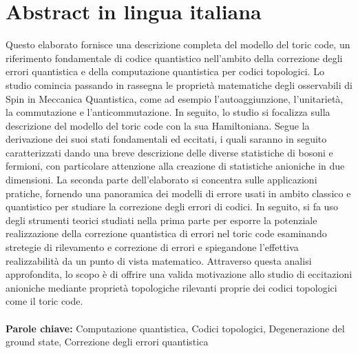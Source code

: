 \documentclass{Configuration_Files/PoliMi3i_thesis}
\begin{document}
\chapter*{Abstract in lingua italiana}
Questo elaborato fornisce una descrizione completa del modello del toric code, un riferimento fondamentale di codice quantistico nell'ambito della correzione degli errori quantistica e della computazione quantistica per codici topologici. Lo studio comincia passando in rassegna le proprietà matematiche degli osservabili di Spin in Meccanica Quantistica, come ad esempio l'autoaggiunzione, l'unitarietà, la commutazione e l'anticommutazione. In seguito, lo studio si focalizza sulla descrizione del modello del toric code con la sua Hamiltoniana. Segue la derivazione dei suoi stati fondamentali ed eccitati, i quali saranno in seguito caratterizzati dando una breve descrizione delle diverse statistiche di bosoni e fermioni, con particolare attenzione alla creazione di statistiche anioniche in due dimensioni. La seconda parte dell'elaborato si concentra sulle applicazioni pratiche, fornendo una panoramica dei modelli di errore usati in ambito classico e quantistico per studiare la correzione degli errori di codici. In seguito, si fa uso degli strumenti teorici studiati nella prima parte per esporre la potenziale realizzazione della correzione quantistica di errori nel toric code esaminando stretegie di rilevamento e  correzione di errori e spiegandone l'effettiva realizzabilità da un punto di vista matematico. Attraverso questa analisi approfondita, lo scopo è di offrire una valida motivazione allo studio di eccitazioni anioniche mediante proprietà topologiche rilevanti proprie dei codici topologici come il toric code. 
\\
\\
\textbf{Parole chiave:} Computazione quantistica, Codici topologici, Degenerazione del ground state, Correzione degli errori quantistica %


\thispagestyle{empty}
\tableofcontents %
\thispagestyle{empty}
\cleardoublepage
\end{document}
